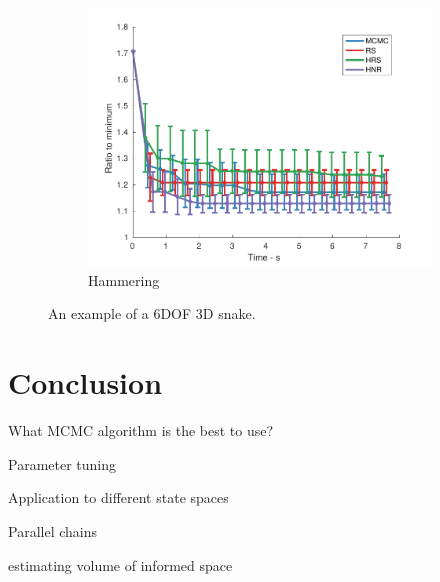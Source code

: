 \documentclass[letterpaper, 10 pt, conference]{ieeeconf}  %
\begin{document}
\begin{figure}[t!]
\begin{subfigure}[b]{0.5\textwidth}
		\label{fig:planning_efficiency:6dof:general}
	\end{subfigure}	
	\begin{subfigure}[b]{0.5\textwidth}
		\includegraphics[width=\linewidth]{fig/planning_efficiency/6dof_hammering}
		\caption{Hammering}
		\label{fig:planning_efficiency:6dof:hammering}
	\end{subfigure}
	\caption{\captionstyle An example of a 6DOF 3D snake.}
	\label{fig:planning_efficiency:3dof}
\end{figure} 



\section{Conclusion}

What MCMC algorithm is the best to use?

Parameter tuning

Application to different state spaces

Parallel chains

estimating volume of informed space







%
\end{document}
